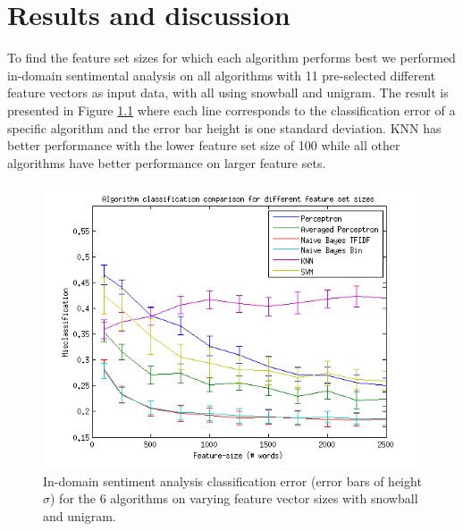 \chapter{Results and discussion}
To find the feature set sizes for which each algorithm performs best we performed in-domain sentimental analysis on all algorithms with 11 pre-selected different feature vectors as input data, with all using snowball and unigram. The result is presented in Figure \ref{fig:featuresize} where each line corresponds to the classification error of a specific algorithm and the error bar height is one standard deviation. KNN has better performance with the lower feature set size of 100 while all other algorithms have better performance on larger feature sets.
\begin{figure}[h!]
\centering
\includegraphics[width=1\linewidth]{../Plottar/feature-size100-2500all.png}
\caption{In-domain sentiment analysis classification error (error bars of height $\sigma$) for the 6 algorithms on varying feature vector sizes with snowball and unigram.}
\label{fig:featuresize}
\end{figure}\\
